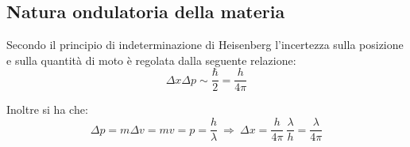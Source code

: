 \documentclass[12pt,twoside,a4]{article}
\begin{document}
\newpage
\subsection{Natura ondulatoria della materia}
\begin{solution}
	Secondo il principio di indeterminazione di Heisenberg l'incertezza sulla posizione e sulla quantità di moto è regolata dalla seguente relazione: \begin{equation*}
\Delta x \Delta p \sim \frac{\hbar}{2} = \frac{h }{4 \pi}    
\end{equation*}

Inoltre si ha che: \begin{equation*}
 \Delta p = m \Delta v = m v = p = \frac{h }{\lambda}  \  \Rightarrow  \  \Delta x = \frac{h}{4\pi} \ \frac{\lambda}{h} = \frac{\lambda}{4 \pi}  
\end{equation*}
\end{solution}
\end{document}
